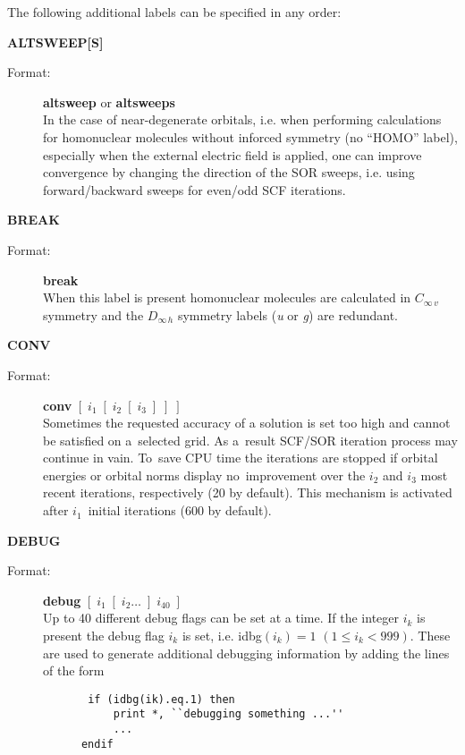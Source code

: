 \documentclass[10pt,a4paper]{article}
\begin{document}
The following additional labels can be specified in any order:
\begin{description}

\item \textbf{ALTSWEEP[S]}
\begin{description}
\item[Format:] \textbf{altsweep} or \textbf{altsweeps}\\
  In the case of near-degenerate orbitals, i.e. when performing
  calculations for homonuclear molecules without inforced symmetry (no
  ``HOMO'' label), especially when the external electric field is applied,
  one can improve convergence by changing the direction of the SOR sweeps,
  i.e. using forward/backward sweeps for even/odd SCF iterations.
\end{description}

  
\item \textbf{BREAK}
\begin{description}
\item[Format:] \textbf{break} \\ When this label is present homonuclear
  molecules are calculated in $C_{\infty\,v}$ symmetry and the
  $D_{\infty\,h}$ symmetry labels ({\it u} or {\it g}) are redundant.

\end{description}


\item \textbf{CONV}
\begin{description}
\item[Format:] \textbf{conv} $[\;i_1\;[\;i_2\;[\;i_3\;]\;]\;]$\\ Sometimes the requested
  accuracy of a solution is set too high and cannot be satisfied on a~selected grid. As
  a~result SCF/SOR iteration process may continue in vain. To~save CPU time the iterations
  are stopped if orbital energies or orbital norms display no~improvement over the $i_2$
  and $i_3$ most recent iterations, respectively (20 by default). This mechanism is
  activated after $i_1$~initial iterations (600 by default).
\end{description}

\item \textbf{DEBUG}
\begin{description}
\item[Format:] \textbf{debug} $[\; i_1 \; [\;i_2 \ldots \;] \;i_{40}\;]$ \\
  Up to 40 different debug flags can be set at a time. If the integer
  $i_k$ is present the debug flag $i_k$ is set, i.e. idbg$(i_k)=1$
  $(1 \leq i_k<999)$. These are used to generate additional debugging
  information by adding the lines of the form
  \begin{verbatim}
       if (idbg(ik).eq.1) then
           print *, ``debugging something ...''
           ...
      endif
    \end{verbatim}
\end{description}


\end{description}
\end{document}
